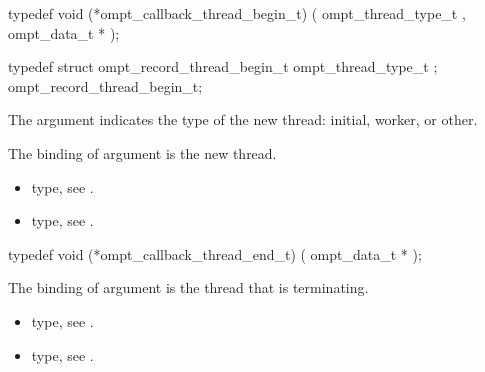 \begin{ccppspecific}
\begin{omptCallback}
typedef void (*ompt_callback_thread_begin_t) (
  ompt_thread_type_t ,
  ompt_data_t *
);
\end{omptCallback}
\end{ccppspecific}


\record

\begin{ccppspecific}
\begin{omptRecord}
typedef struct ompt_record_thread_begin_t {
  ompt_thread_type_t ;
} ompt_record_thread_begin_t;
\end{omptRecord}
\end{ccppspecific}


\argdesc

The argument 
indicates the type of the new thread: initial, worker, or other.

The binding of argument  is the new thread.

\crossreferences
\begin{itemize}
\item {} type, see
.
\item {} type, see
.
\end{itemize}



\label{sec:ompt_callback_thread_end_t}
\format

\begin{ccppspecific}
\begin{omptCallback}
typedef void (*ompt_callback_thread_end_t) (
  ompt_data_t *
);
\end{omptCallback}
\end{ccppspecific}


\argdesc

The binding of argument  is the thread that is
terminating.

\crossreferences
\begin{itemize}
\item {} type, see
.
\item {} type, see
.
\end{itemize}


